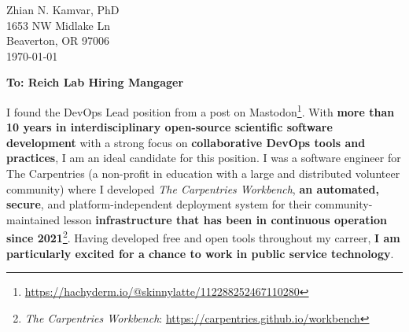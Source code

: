 


\clearpage
\begin{flushright}
  Zhian N. Kamvar, PhD\\
  1653 NW Midlake Ln\\
  Beaverton, OR 97006\\
  \today
\end{flushright}

\textbf{To: Reich Lab Hiring Mangager}\\

\vspace{2ex}


I found the DevOps Lead position from a post on Mastodon\footnote{\url{https://hachyderm.io/@skinnylatte/112288252467110280}}. 
With \textbf{more than 10 years in interdisciplinary open-source scientific software development} %
with a strong focus on \textbf{collaborative DevOps tools and practices}, %
I am an ideal candidate for this position. 
I was a software engineer for The Carpentries (a non-profit in education with a large and distributed volunteer community) where I developed \textit{The Carpentries Workbench}, \textbf{an automated, secure}, and platform-independent deployment system for their community-maintained lesson \textbf{infrastructure that has been in continuous operation since 2021}\footnote{\textit{The Carpentries Workbench}: \url{https://carpentries.github.io/workbench}}.%
Having developed free and open tools throughout my carreer, \textbf{I am particularly excited for a chance to work in public service technology}. 



